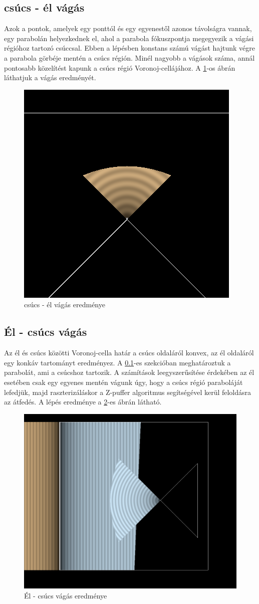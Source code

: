 \subsection{csúcs - él vágás} \label{vertex_segment_cut}
Azok a pontok, amelyek egy ponttól és egy egyenestől azonos távolságra vannak, egy parabolán helyezkednek el, ahol a parabola fókuszpontja megegyezik a vágási régióhoz tartozó csúccsal. Ebben a lépésben konstans számú vágást hajtunk végre a parabola görbéje mentén a csúcs régión. Minél nagyobb a vágások száma, annál pontosabb közelítést kapunk a csúcs régió Voronoj-cellájához. A \ref{fig:vertex_segment_cut-1}-os ábrán láthatjuk a vágás eredményét.

\begin{figure}[H]
	\centering
	\includegraphics[width=.55\linewidth]{images/vertex_segment_cut.png}
	\caption{csúcs - él vágás eredménye}
	\label{fig:vertex_segment_cut-1}
\end{figure}

\subsection{Él - csúcs vágás}
Az él és csúcs közötti Voronoj-cella határ a csúcs oldaláról konvex, az él oldaláról egy konkáv tartományt eredményez. A \ref{vertex_segment_cut}-es szekcióban meghatároztuk a parabolát, ami a csúcshoz tartozik. A számítások leegyszerűsítése érdekében az él esetében csak egy egyenes mentén vágunk úgy, hogy a csúcs régió paraboláját lefedjük, majd raszterizáláskor a Z-puffer algoritmus segítségével kerül feloldásra az átfedés. A lépés eredménye a \ref{fig:segment_vertex_cut-1}-es ábrán látható.

\begin{figure}[H]
	\centering
	\includegraphics[width=.55\linewidth]{images/segment_vertex_cut.png}
	\caption{Él - csúcs vágás eredménye}
	\label{fig:segment_vertex_cut-1}
\end{figure}

